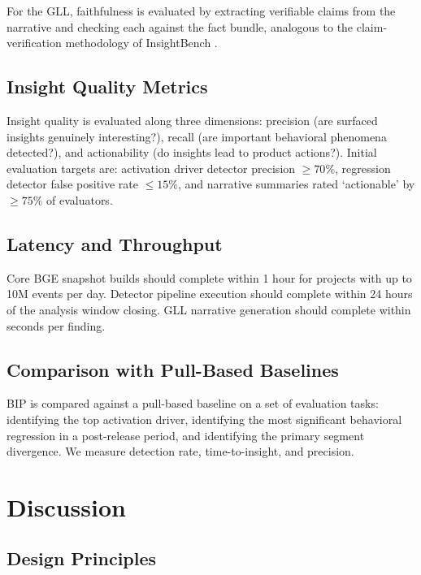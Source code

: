 \documentclass[12pt, a4paper]{article}
\begin{document}
For the GLL, faithfulness is evaluated by extracting verifiable claims from the narrative and checking each against the fact bundle, analogous to the claim-verification methodology of InsightBench \cite{sahu2024}.

\subsection{Insight Quality Metrics}

Insight quality is evaluated along three dimensions: precision (are surfaced insights genuinely interesting?), recall (are important behavioral phenomena detected?), and actionability (do insights lead to product actions?). Initial evaluation targets are: activation driver detector precision $\geq 70\%$, regression detector false positive rate $\leq 15\%$, and narrative summaries rated `actionable' by $\geq 75\%$ of evaluators.

\subsection{Latency and Throughput}

Core BGE snapshot builds should complete within 1 hour for projects with up to 10M events per day. Detector pipeline execution should complete within 24 hours of the analysis window closing. GLL narrative generation should complete within seconds per finding.

\subsection{Comparison with Pull-Based Baselines}

BIP is compared against a pull-based baseline on a set of evaluation tasks: identifying the top activation driver, identifying the most significant behavioral regression in a post-release period, and identifying the primary segment divergence. We measure detection rate, time-to-insight, and precision.

\section{Discussion}
\label{sec:discussion}

\subsection{Design Principles}
\end{document}
